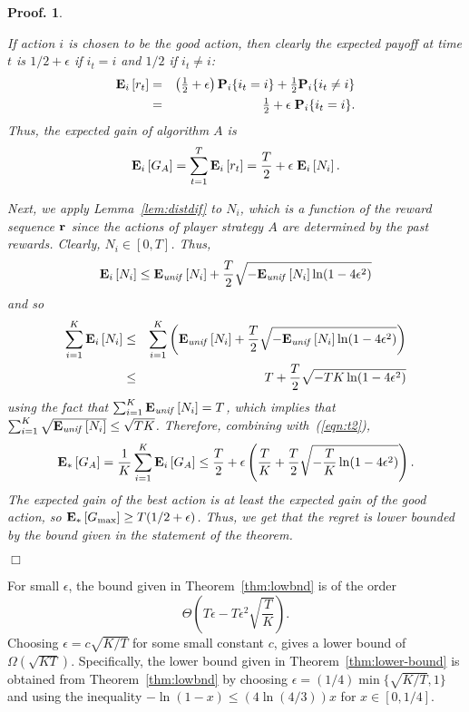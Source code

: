 \documentclass[12pt]{article}
\newcommand{\paren}[1]{\left({#1}\right)}
\renewcommand{\i}[1]{i_{#1}}
\newcommand{\Gactbest}{G_{\rm max}}
\newtheorem{pproof}{Proof.}
\newenvironment{proof}{
\begin{pproof}
        \begin{rm}\begin{rm}}{
        \hspace*{\fill} $\Box$
        \end{rm}\end{rm}
        \end{pproof}
}
\newcommand{\distcom}[2]{#1 \{#2\}}
\newcommand{\Peid}{{\bf P}_{i}}
\newcommand{\Pei}[1]{\distcom{\Peid}{#1}}%
\newcommand{\Eu}[1]{{\bf E}_{\it unif} \left[#1\right]}
\newcommand{\Ee}[1]{{\bf E}_{*} \left[#1\right]}
\newcommand{\Ei}[1]{{\bf E}_{i} \left[#1\right]}
\renewcommand{\r}[1]{{r_{#1}}}
\newcommand{\rvec}[1]{{{\bf r}^{#1}}}
\newcommand{\rv}{\rvec{}}
\newcommand{\numai}{{N_i}}
\newcommand{\lneps}{\ln(1-4\epsilon^2)}
\newcommand{\sfrac}[2]{\mbox{$\frac{#1}{#2}$}}
\begin{document}
\begin{proof}
If action $i$ is chosen to be the good action, then clearly the
expected payoff at time $t$ is $1/2+\epsilon$ if $\i{t}=i$ and $1/2$
if $\i{t}\neq i$:
\begin{eqnarray*}
\Ei{\r{t}} &=& \paren{\sfrac{1}{2}+\epsilon} \Pei{\i{t}=i}
               + \sfrac{1}{2} \Pei{\i{t}\neq i} \\
     &=& \sfrac{1}{2} + \epsilon\;  \Pei{\i{t}=i}.
\end{eqnarray*}
Thus, the expected gain of algorithm $A$ is
\begin{equation} \label{eqn:t2}
\Ei{G_A} = \sum_{t=1}^T \Ei{\r{t}} = \frac{T}{2} + \epsilon\; \Ei{\numai}.
\end{equation}

Next, we apply Lemma~\ref{lem:distdif} to $\numai$, which is a
function of the reward sequence $\rv$ since the actions of player
strategy $A$ are determined by the past rewards.
Clearly, $\numai\in [0,T]$.
Thus,
\[
\Ei{\numai}\leq \Eu{\numai} + \frac{T}{2} \sqrt{-\Eu{\numai}\lneps}
\]
and so
\begin{eqnarray*}
\sum_{i=1}^K \Ei{\numai}
&\leq&
 \sum_{i=1}^K \paren{\Eu{\numai} + \frac{T}{2} \sqrt{-\Eu{\numai}\lneps}}\\
&\leq&
 T + \frac{T}{2}\sqrt{-TK\lneps}
\end{eqnarray*}
using the fact that $\sum_{i=1}^K \Eu{\numai} = T$, which implies that
$\sum_{i=1}^K \sqrt{\Eu{\numai}} \leq \sqrt{TK}$.
Therefore, combining with~(\ref{eqn:t2}),
\[
\Ee{G_A} = \frac{1}{K}\sum_{i=1}^K \Ei{G_A}
    \leq \frac{T}{2} 
   + \epsilon \paren{\frac{T}{K} +
                       \frac{T}{2}\sqrt{-\frac{T}{K}\lneps}}.
\]
The expected gain of the best action is at least the expected gain of
the good action, so
$\Ee{\Gactbest} \geq T(1/2+\epsilon)$.
Thus, we get that the regret is lower bounded by the bound given in
the statement of the theorem.
\end{proof}
%
For small $\epsilon$, the bound given in Theorem~\ref{thm:lowbnd}
is of the order
\[
\Theta\paren{T\epsilon - T\epsilon^2\sqrt{\frac{T}{K}}}.
\]
Choosing $\epsilon=c\sqrt{K/T}$ for some small constant $c$, gives a
lower bound of $\Omega(\sqrt{KT})$.
Specifically, the lower bound given in Theorem~\ref{thm:lower-bound}
is obtained from Theorem~\ref{thm:lowbnd}
by choosing $\epsilon = (1/4) \min\{\sqrt{K/T},1\}$ and using the
inequality $-\ln(1-x)\leq (4\ln(4/3)) x$ for $x\in[0,1/4]$.
\end{document}

